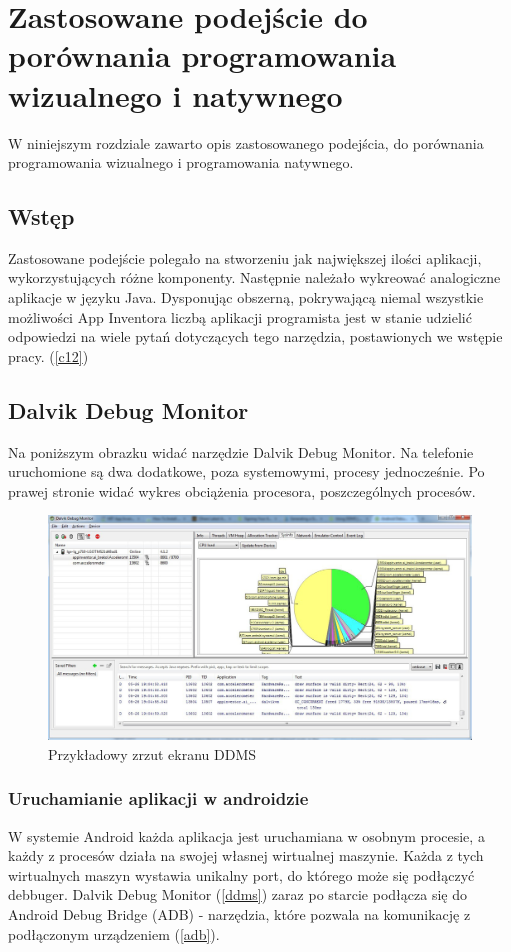 \chapter{Zastosowane podejście do porównania programowania wizualnego i natywnego}
\label{c4}

W niniejszym rozdziale zawarto opis zastosowanego podejścia, do porównania programowania wizualnego i programowania natywnego.

\section{Wstęp}
\label{c41}

Zastosowane podejście polegało na stworzeniu jak największej ilości aplikacji, wykorzystujących różne komponenty. Następnie należało wykreować analogiczne aplikacje w języku Java. Dysponując obszerną, pokrywającą niemal wszystkie możliwości App Inventora  liczbą aplikacji programista jest w stanie udzielić odpowiedzi na wiele pytań dotyczących tego narzędzia, postawionych we wstępie pracy. (\ref{c12})

\section{Dalvik Debug Monitor}

Na poniższym obrazku widać narzędzie Dalvik Debug Monitor. Na telefonie uruchomione są dwa dodatkowe, poza systemowymi, procesy jednocześnie. Po prawej stronie widać wykres obciążenia procesora, poszczególnych procesów.

\begin{figure}[H] 
\centering\includegraphics[width=12cm]{figures/dalvik}
\caption{Przykładowy zrzut ekranu DDMS}
\end{figure}



\subsection{Uruchamianie aplikacji w androidzie}
W systemie Android każda aplikacja jest uruchamiana w osobnym procesie, a każdy z procesów działa na swojej własnej wirtualnej maszynie. Każda z tych wirtualnych maszyn wystawia unikalny port, do którego może się podłączyć debbuger. Dalvik Debug Monitor (\ref{ddms}) zaraz po starcie podłącza się do Android Debug Bridge (ADB) - narzędzia, które pozwala na komunikację z podłączonym urządzeniem (\ref{adb}).

